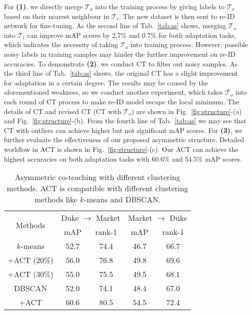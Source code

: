 \documentclass[letterpaper]{article} \usepackage{aaai20}  \usepackage{times}  \usepackage{helvet} \usepackage{courier}  \usepackage[hyphens]{url}  \usepackage{graphicx} \urlstyle{rm} \def\UrlFont{\rm}  \usepackage{graphicx}  \frenchspacing  \setlength{\pdfpagewidth}{8.5in}  \setlength{\pdfpageheight}{11in}  \usepackage{color}
\begin{document}
For \textbf{(1)}, we directly merge $\mathcal{T}_o$ into the training process by giving labels to $\mathcal{T}_{o}$ based on their nearest neighbour in $\mathcal{T}_{i}$. The new dataset is then sent to re-ID network for fine-tuning. As the second line of Tab.~\ref{tab:as} shows, merging $\mathcal{T}_{o}$ into $\mathcal{T}_{i}$ can improve mAP scores by 2.7\% and 0.7\% for both adaptation tasks, which indicates the necessity of taking $\mathcal{T}_{o}$ into training process. However, possible noisy labels in training samples may hinder the further improvement on re-ID accuracies. To demonstrate \textbf{(2)}, we conduct CT to filter out noisy samples. As the third line of Tab.~\ref{tab:as} shows, the original CT has a slight improvement for adaptation in a certain degree. The results may be caused by the aforementioned weakness, so we conduct another experiment, which takes $\mathcal{T}_o$ into each round of CT process to make re-ID model escape the local minimum. The details of CT and revised CT (CT with $\mathcal{T}_{o}$) are shown in Fig.~\ref{fig:structure}-(a) and Fig.~\ref{fig:structure}-(b). From the fourth line of Tab.~\ref{tab:as} we may see that CT with outliers can achieve higher but not significant mAP scores. For \textbf{(3)}, we further evaluate the effectiveness of our proposed asymmetric structure. Detailed workflow in ACT is shown in Fig.~\ref{fig:structure}-(c). Our ACT can achieve the highest accuracies on both adaptation tasks with 60.6\% and 54.5\% mAP scores.


\begin{table}[!t]
    \centering
    \caption{Asymmetric co-teaching with different clustering methods. ACT is compatible with different clustering methods like $k$-means and DBSCAN.}
    \label{tab:clusterAS}
    \begin{tabular}{c|cc|cc} 
        \hline
        \multirow{2}{*}{Methods} & \multicolumn{2}{c}{Duke $\rightarrow$ Market} \vline & \multicolumn{2}{c}{Market $\rightarrow$ Duke}\\
        \cline{2-5}
          & mAP & rank-1 & mAP & rank-1\\
        \hline
        $k$-means & 52.7 & 74.4 & 46.7 & 66.7 \\
        +ACT (20\%) & 56.0 & 76.8 & 49.8 & 69.6 \\
        +ACT (30\%) & 55.0 & 75.5 & 49.5 & 68.1 \\
        \hline
        DBSCAN & 52.0 & 74.1 & 48.4 & 67.0 \\
        +ACT  & 60.6 & 80.5 & 54.5 & 72.4\\
        \hline
      \end{tabular}
\end{table}
\end{document}
